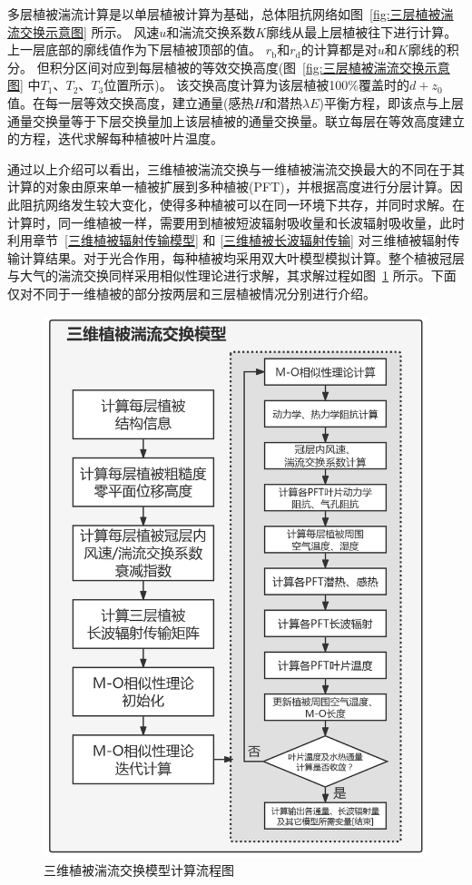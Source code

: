 多层植被湍流计算是以单层植被计算为基础，总体阻抗网络如图~\ref{fig:三层植被湍流交换示意图} 所示。
风速$u$和湍流交换系数$K$廓线从最上层植被往下进行计算。上一层底部的廓线值作为下层植被顶部的值。
$r_{\mathrm {b}}$和$r_{\mathrm {d}}$的计算都是对$u$和$K$廓线的积分。
但积分区间对应到每层植被的等效交换高度(图~\ref{fig:三层植被湍流交换示意图} 中$T_{1}$、$T_{2}$、$T_{3}$位置所示)。
该交换高度计算为该层植被100\%覆盖时的$d+z_0$值。在每一层等效交换高度，建立通量(感热$H$和潜热$\lambda E$)平衡方程，即该点与上层通量交换量等于下层交换量加上该层植被的通量交换量。联立每层在等效高度建立的方程，迭代求解每种植被叶片温度。

通过以上介绍可以看出，三维植被湍流交换与一维植被湍流交换最大的不同在于其计算的对象由原来单一植被扩展到多种植被(PFT)，并根据高度进行分层计算。因此阻抗网络发生较大变化，使得多种植被可以在同一环境下共存，并同时求解。在计算时，同一维植被一样，需要用到植被短波辐射吸收量和长波辐射吸收量，此时利用章节~\ref{三维植被辐射传输模型} 和 \ref{三维植被长波辐射传输} 对三维植被辐射传输计算结果。对于光合作用，每种植被均采用双大叶模型模拟计算。整个植被冠层与大气的湍流交换同样采用相似性理论进行求解，其求解过程如图~\ref{fig:三维植被湍流交换模型计算流程图} 所示。下面仅对不同于一维植被的部分按两层和三层植被情况分别进行介绍。
{
  \begin{figure}[htbp]
    \centering
    \includegraphics[width=0.75\linewidth]{Figures/地表湍流交换过程/三维植被湍流交换模型计算流程图_v2.png}
    \caption{三维植被湍流交换模型计算流程图}
    \label{fig:三维植被湍流交换模型计算流程图}
  \end{figure}
}


